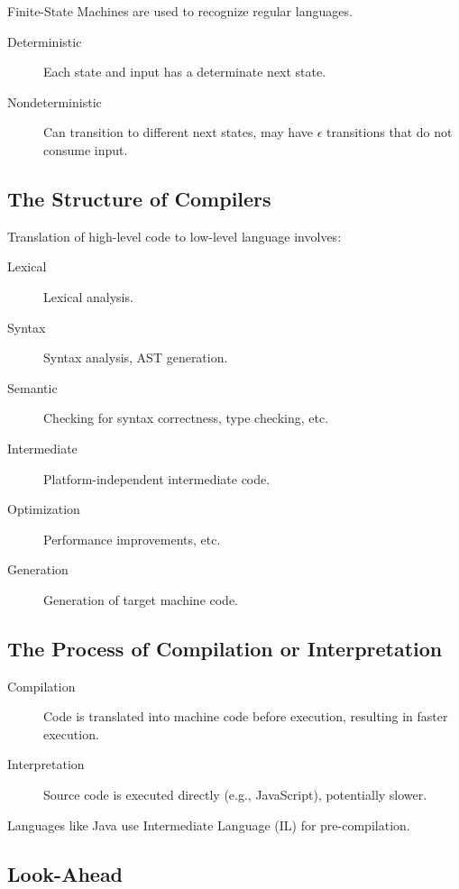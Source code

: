 \documentclass[11pt,journal,compsoc]{IEEEtran}
\begin{document}
Finite-State Machines are used to recognize regular languages.

\begin{description}
    \item[Deterministic] Each state and input has a determinate next state.
    
    \item[Nondeterministic] Can transition to different next states, may have $\epsilon$ transitions that do not consume input.
\end{description}


\subsection{The Structure of Compilers}

Translation of high-level code to low-level language involves:

\begin{description}
    \item[Lexical] Lexical analysis.
    \item[Syntax] Syntax analysis, AST generation.
    \item[Semantic] Checking for syntax correctness, type checking, etc.
    \item[Intermediate] Platform-independent intermediate code.
    \item[Optimization] Performance improvements, etc.
    \item[Generation] Generation of target machine code.
\end{description}


\subsection{The Process of Compilation or Interpretation}

\begin{description}
    \item[Compilation] Code is translated into machine code before execution, resulting in faster execution.
    
    \item[Interpretation] Source code is executed directly (e.g., JavaScript), potentially slower.
\end{description}

Languages like Java use Intermediate Language (IL) for pre-compilation.


\subsection{Look-Ahead}
\end{document}
